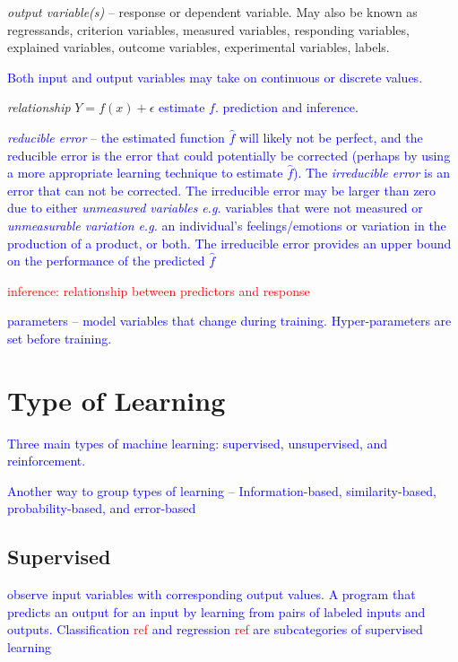 \emph{output variable(s)} -- response or dependent variable. May also be known as regressands, criterion variables, measured variables, responding variables, explained variables, outcome variables, experimental variables, labels.

\textcolor{blue}{Both input and output variables may take on continuous or discrete values.}

\emph{relationship} $Y = f(x) + \epsilon$ \textcolor{blue}{estimate $f$. prediction and inference}.

\textcolor{blue}{\emph{{reducible error}} -- the estimated function $\hat{f}$ will likely not be perfect, and the reducible error is the error that could potentially be corrected (perhaps by using a more appropriate learning technique to estimate $\hat{f}$).  The \emph{irreducible error} is an error that can not be corrected. The irreducible error may be larger than zero due to either \emph{unmeasured variables} \emph{e.g.} variables that were not measured or \emph{unmeasurable variation} \emph{e.g.} an individual's feelings/emotions or variation in the production of a product, or both. The irreducible error provides an upper bound on the performance of the predicted $\hat{f}$}

\textcolor{red}{inference: relationship between predictors and response}

\textcolor{blue}{parameters -- model variables that change during training. Hyper-parameters are set before training.}

\section{Type of Learning}

\textcolor{blue}{Three main types of machine learning: supervised, unsupervised, and reinforcement.}

\textcolor{blue}{Another way to group types of learning -- Information-based, similarity-based, probability-based, and error-based}

\subsection{Supervised}

\textcolor{blue}{observe input variables with corresponding output values. A program that predicts an output for an input by learning from pairs of labeled inputs and outputs. Classification \textcolor{red}{ref} and regression \textcolor{red}{ref} are subcategories of supervised learning}

